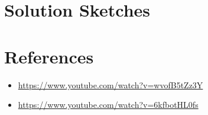 \documentclass[11pt,twoside]{scrartcl}
\begin{document}
\clearpage
\section{Solution Sketches}
\makehints
\newpage
\section{References}
\begin{itemize}
    \item \url{https://www.youtube.com/watch?v=wvofB5tZz3Y}
    \item \url{https://www.youtube.com/watch?v=6kfbotHL0fs}
\end{itemize}
\end{document}
